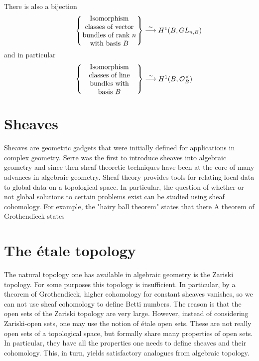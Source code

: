 There is also a bijection
\begin{align}
            \left\{ \parbox[c]{1.1in}{\centering
              Isomorphism classes of vector bundles of rank $n$ with basis $B$}
            \right\}
            \stackrel{\sim}{\longrightarrow}
            \parbox[c]{0.5in}{\centering
            $H^1(B, GL_{n,B})$}
\end{align}
and in particular
\begin{align}
            \left\{ \parbox[c]{1.1in}{\centering
            Isomorphism classes of line bundles with basis $B$}
            \right\}
            \stackrel{\sim}{\longrightarrow}
            \parbox[c]{0.5in}{\centering
                $H^1(B, \OO_B^\times)$}
\end{align}





\section{Sheaves}
Sheaves are geometric gadgets that were initially defined for applications in complex geometry. Serre was the first to introduce sheaves into algebraic geometry and since then sheaf-theoretic techniques have been at the core of many advances in algebraic geometry.  Sheaf theory provides tools for relating local data to global data on a topological space. In particular, the question of whether or not global solutions to certain problems exist can be studied using sheaf cohomology. For example, the "hairy ball theorem" states that there  A theorem of Grothendieck states

\section{The \'etale topology}
The natural topology one has available in algebraic geometry is the Zariski topology. For some purposes this topology is insufficient. In particular, by a theorem of Grothendieck, higher cohomology for constant sheaves vanishes, so we can not use sheaf cohomology to define Betti numbers. The reason is that the open sets of the Zariski topology are very large. However, instead of considering Zariski-open sets, one may use the notion of \'etale open sets. These are not really open sets of a topological space, but formally share many properties of open sets. In particular, they have all the properties one needs to define sheaves and their cohomology. This, in turn, yields satisfactory analogues from algebraic topology. 

